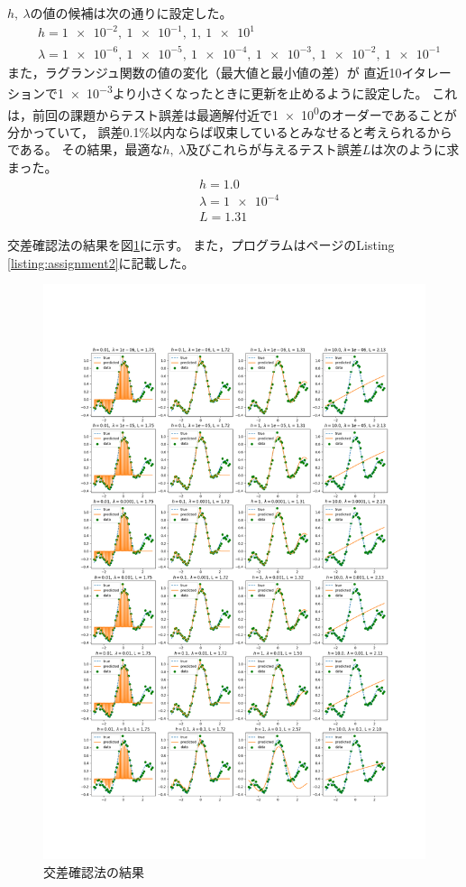 \documentclass[class=jsarticle, crop=false, dvipdfmx, fleqn]{standalone}
\begin{document}
\(h,\ \lambda\)の値の候補は次の通りに設定した。
\begin{align}
	& h = \num{1e-2},\ \num{1e-1},\ \num{1},\ \num{1e1} \\
	& \lambda = \num{1e-6},\ \num{1e-5},\ \num{1e-4},\ \num{1e-3},\ \num{1e-2},\ \num{1e-1}
\end{align}
また，ラグランジュ関数の値の変化（最大値と最小値の差）が
直近10イタレーションで\num{1e-3}より小さくなったときに更新を止めるように設定した。
これは，前回の課題からテスト誤差は最適解付近で\num{1e0}のオーダーであることが分かっていて，
誤差0.1{\%}以内ならば収束しているとみなせると考えられるからである。
その結果，最適な\(h,\ \lambda\)及びこれらが与えるテスト誤差\(L\)は次のように求まった。
\begin{align}
	& h = 1.0 \\
	& \lambda = \num{1e-4} \\
	& L = 1.31
\end{align}

交差確認法の結果を図\ref{fig:result_global_search}に示す。
また，プログラムは\pageref{listing:assignment2}ページのListing \ref{listing:assignment2}に記載した。

\begin{figure}
	\centering
	\includegraphics[clip, width=15cm, trim=0 144 0 216]{../figures/assignment2_result}
	\caption{交差確認法の結果}
	\label{fig:result_global_search}
\end{figure}
\end{document}
